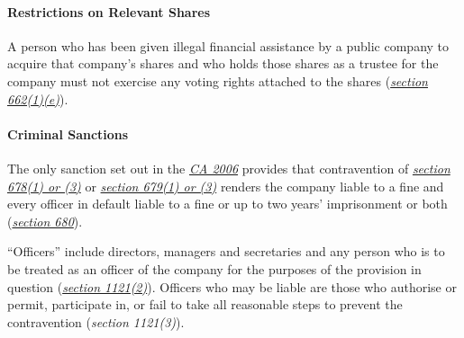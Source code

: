 \documentclass[
]{article}
\begin{document}
\hypertarget{restrictions-on-relevant-shares}{%
\paragraph{Restrictions on Relevant
Shares}\label{restrictions-on-relevant-shares}}

A person who has been given illegal financial assistance by a public
company to acquire that company's shares and who holds those shares as a
trustee for the company must not exercise any voting rights attached to
the shares
(\emph{\href{https://uk.westlaw.com/5-506-0543?originationContext=document\&transitionType=PLDocumentLink\&contextData=(sc.Default)\&ppcid=fc9f4d9e83af4b4c8d47bf5847a3205c}{section
662(1)(e)}}).

\hypertarget{criminal-sanctions}{%
\paragraph{Criminal Sanctions}\label{criminal-sanctions}}

The only sanction set out in the
\emph{\href{https://uk.westlaw.com/3-503-8567?originationContext=document\&transitionType=PLDocumentLink\&contextData=(sc.Default)\&ppcid=fc9f4d9e83af4b4c8d47bf5847a3205c}{CA
2006}} provides that contravention of
\emph{\href{https://uk.westlaw.com/5-505-7258?originationContext=document\&transitionType=PLDocumentLink\&contextData=(sc.Default)\&ppcid=fc9f4d9e83af4b4c8d47bf5847a3205c}{section
678(1) or (3)}} or
\emph{\href{https://uk.westlaw.com/6-506-2056?originationContext=document\&transitionType=PLDocumentLink\&contextData=(sc.Default)\&ppcid=fc9f4d9e83af4b4c8d47bf5847a3205c}{section
679(1) or (3)}} renders the company liable to a fine and every officer
in default liable to a fine or up to two years' imprisonment or both
(\emph{\href{https://uk.westlaw.com/4-506-2057?originationContext=document\&transitionType=PLDocumentLink\&contextData=(sc.Default)\&ppcid=fc9f4d9e83af4b4c8d47bf5847a3205c}{section
680}}).

``Officers'' include directors, managers and secretaries and any person
who is to be treated as an officer of the company for the purposes of
the provision in question
(\emph{\href{https://uk.westlaw.com/2-506-8531?originationContext=document\&transitionType=PLDocumentLink\&contextData=(sc.Default)\&ppcid=fc9f4d9e83af4b4c8d47bf5847a3205c}{section
1121(2)}}). Officers who may be liable are those who authorise or
permit, participate in, or fail to take all reasonable steps to prevent
the contravention (\emph{section 1121(3)}).
\end{document}
